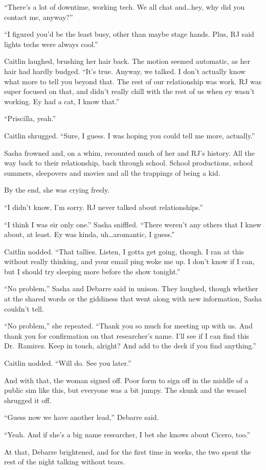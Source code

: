``There's a lot of downtime, working tech. We all chat and\ldots{}hey, why did you contact me, anyway?''

``I figured you'd be the least busy, other than maybe stage hands. Plus, RJ said lights techs were always cool.''

Caitlin laughed, brushing her hair back. The motion seemed automatic, as her hair had hardly budged. ``It's true. Anyway, we talked. I don't actually know what more to tell you beyond that. The rest of our relationship was work. RJ was super focused on that, and didn't really chill with the rest of us when ey wasn't working. Ey had a cat, I know that.''

``Priscilla, yeah.''

Caitlin shrugged. ``Sure, I guess. I was hoping you could tell me more, actually.''

Sasha frowned and, on a whim, recounted much of her and RJ's history. All the way back to their relationship, back through school. School productions, school summers, sleepovers and movies and all the trappings of being a kid.

By the end, she was crying freely.

``I didn't know, I'm sorry. RJ never talked about relationships.''

``I think I was eir only one.'' Sasha sniffled. ``There weren't any others that I knew about, at least. Ey was kinda, uh\ldots{}aromantic, I guess.''

Caitlin nodded. ``That tallies. Listen, I gotta get going, though. I ran at this without really thinking, and your email ping woke me up. I don't know if I can, but I should try sleeping more before the show tonight.''

``No problem,'' Sasha and Debarre said in unison. They laughed, though whether at the shared words or the giddiness that went along with new information, Sasha couldn't tell.

``No problem,'' she repeated. ``Thank you so much for meeting up with us. And thank you for confirmation on that researcher's name. I'll see if I can find this Dr.~Ramirez. Keep in touch, alright? And add to the deck if you find anything.''

Caitlin nodded. ``Will do. See you later.''

And with that, the woman signed off. Poor form to sign off in the middle of a public sim like this, but everyone was a bit jumpy. The skunk and the weasel shrugged it off.

``Guess now we have another lead,'' Debarre said.

``Yeah. And if she's a big name researcher, I bet she knows about Cicero, too.''

At that, Debarre brightened, and for the first time in weeks, the two spent the rest of the night talking without tears.
